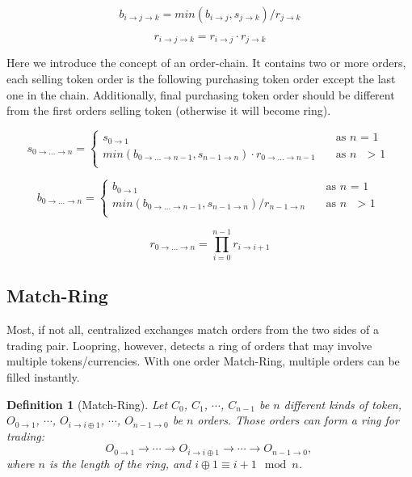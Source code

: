 \documentclass[UTF8,nofonts]{article}
\newtheorem{definition}{Definition}[section]
\begin{document}
\begin{equation}
b_{i\rightarrow j\rightarrow k}=min(b_{i\rightarrow j}, s_{j\rightarrow k}) / r_{j\rightarrow k}
\end{equation}

\begin{equation}
r_{i\rightarrow j\rightarrow k}= r_{i\rightarrow j}\cdot r_{j\rightarrow k}
\end{equation}


Here we introduce the concept of an order-chain. It contains two or more orders, each selling token order is the following  purchasing token order except the last one in the chain. Additionally, final purchasing token order should be different from the first orders selling token (otherwise it will become ring).

\[ s_{0\rightarrow ...\rightarrow n} =
 \begin{cases}
  s_{0\rightarrow 1}   & \quad \text{as } n \text{ = 1}\\
  min(b_{0\rightarrow ...\rightarrow n-1}, s_{n-1\rightarrow n}) \cdot r_{0\rightarrow ...\rightarrow n-1} & \quad \text{as\ } n \text{ $>$ 1}\\
 \end{cases}
\]

\[ b_{0\rightarrow ...\rightarrow n} =
 \begin{cases}
  b_{0\rightarrow 1}   & \quad \text{as } n \text{ = 1}\\
  min(b_{0\rightarrow ...\rightarrow n-1}, s_{n-1\rightarrow n}) / r_{n-1\rightarrow n} & \quad \text{as\ } n \text{ $>$ 1}\\
 \end{cases}
\]


\[ r_{0\rightarrow ...\rightarrow n} = \prod_{i=0}^{n-1}{r_{i\rightarrow i+1}}
\]


\subsection{Match-Ring}

Most, if not all, centralized exchanges match orders from the two sides of a trading pair. Loopring, however, detects a ring of orders that may involve multiple tokens/currencies. With one order Match-Ring, multiple orders can be filled instantly.

\begin{definition}[Match-Ring] Let $C_{0}$, $C_{1}$, $\cdots$, $C_{n-1}$ be $n$ different kinds of token, $O_{0\rightarrow 1}$, $\cdots$, $O_{i\rightarrow i\oplus 1}$, $\cdots$, $O_{n-1 \rightarrow 0}$ be $n$ orders. Those orders can form a ring for trading:
$$O_{0\rightarrow 1} \rightarrow \cdots \rightarrow O_{i\rightarrow i\oplus 1} \rightarrow \cdots \rightarrow O_{n-1\rightarrow 0} \text{, }$$
where $n$ is the length of the ring, and $i\oplus 1 \equiv i+1 \mod n$.
\end{definition}
\end{document}
